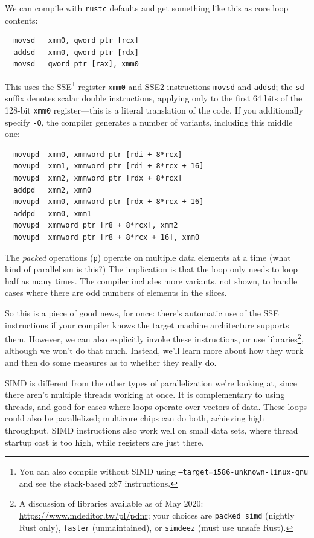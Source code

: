 \documentclass[a4paper]{report}
\begin{document}
We can compile with \texttt{rustc} defaults
and get something like this as core loop contents:
\begin{verbatim}
  movsd   xmm0, qword ptr [rcx]
  addsd   xmm0, qword ptr [rdx]
  movsd   qword ptr [rax], xmm0
\end{verbatim}
This uses the SSE\footnote{You can also compile without SIMD using \texttt{--target=i586-unknown-linux-gnu} and see the stack-based x87 instructions.} register \texttt{xmm0} and SSE2 instructions \texttt{movsd} and
\texttt{addsd}; the \texttt{sd} suffix denotes scalar double instructions, applying
only to the first 64 bits of the 128-bit \texttt{xmm0} register---this is a literal
translation of the code. If you additionally specify \texttt{-O}, the compiler generates a number of variants, including this middle one:
\begin{verbatim}
  movupd  xmm0, xmmword ptr [rdi + 8*rcx]
  movupd  xmm1, xmmword ptr [rdi + 8*rcx + 16]
  movupd  xmm2, xmmword ptr [rdx + 8*rcx]
  addpd   xmm2, xmm0
  movupd  xmm0, xmmword ptr [rdx + 8*rcx + 16]
  addpd   xmm0, xmm1
  movupd  xmmword ptr [r8 + 8*rcx], xmm2
  movupd  xmmword ptr [r8 + 8*rcx + 16], xmm0
\end{verbatim}
The \emph{packed} operations ({\tt p}) operate on multiple data
elements at a time (what kind of parallelism is this?)  The
implication is that the loop only needs to loop half as many times.
The compiler includes more variants, not shown, to handle cases where
there are odd numbers of elements in the slices.

So this is a piece of good news, for once: there's automatic use of the SSE instructions if your compiler knows the target machine architecture supports them. However, we can also explicitly invoke these instructions, or use libraries\footnote{A discussion of libraries available as of May 2020: \url{https://www.mdeditor.tw/pl/pdnr}; your choices are \texttt{packed\_simd} (nightly Rust only), \texttt{faster} (unmaintained), or \texttt{simdeez} (must use unsafe Rust).}, although we won't do that much. Instead, we'll learn more about how they work and then do some measures as to whether they really do.

SIMD is different from the other types of parallelization we're
looking at, since there aren't multiple threads working at once.
It is complementary to using threads, and good for cases
where loops operate over vectors of data. These loops could also be
parallelized; multicore chips can do both, achieving high throughput.
SIMD instructions also work well on small data sets, where thread startup
cost is too high, while registers are just there.
\end{document}
